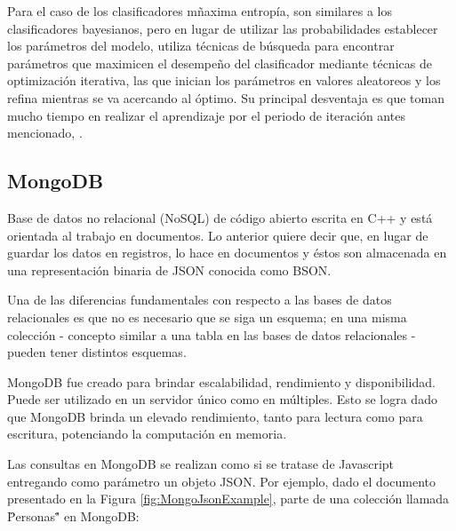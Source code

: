 Para el caso de los clasificadores mñaxima entropía, son similares a los clasificadores bayesianos, pero en lugar de utilizar las probabilidades establecer los parámetros del modelo, utiliza técnicas de búsqueda para encontrar parámetros que maximicen el desempeño del clasificador mediante técnicas de optimización iterativa, las que inician los parámetros en valores aleatoreos y los refina mientras se va acercando al óptimo. Su principal desventaja es que toman mucho tiempo en realizar el aprendizaje por el periodo de iteración antes mencionado, \cite{NPLK}.

\subsection*{MongoDB}
\label{subsubsec:mongoDB}

Base de datos no relacional (NoSQL) de código abierto escrita en C++ y está orientada al trabajo en documentos. Lo anterior quiere decir que, en lugar de guardar los datos en registros, lo hace en documentos y éstos son almacenada en una representación binaria de JSON conocida como BSON.

Una de las diferencias fundamentales con respecto a las bases de datos relacionales es que no es necesario que se siga un esquema; en una misma colección - concepto similar a una tabla en las bases de datos relacionales - pueden tener distintos esquemas.

MongoDB fue creado para brindar escalabilidad, rendimiento y disponibilidad. Puede ser utilizado en un servidor único como en múltiples. Esto se logra dado que MongoDB brinda un elevado rendimiento, tanto para lectura como para escritura, potenciando la computación en memoria.

Las consultas en MongoDB se realizan como si se tratase de Javascript entregando como parámetro un objeto JSON. Por ejemplo, dado el documento presentado en la Figura \ref{fig:MongoJsonExample}, parte de una colección llamada \"Personas\"" en MongoDB:

